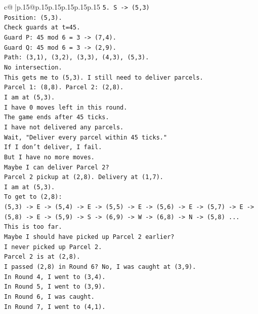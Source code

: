 \documentclass{article}
\begin{document}
{\begin{supertabular}{c@{$\;$}|p{.15\linewidth}@{}p{.15\linewidth}p{.15\linewidth}p{.15\linewidth}p{.15\linewidth}p{.15\linewidth}}
{{{\texttt{5. S {-}> (5,3)} \\
\texttt{Position: (5,3).} \\
\texttt{Check guards at t=45.} \\
\texttt{Guard P: 45 mod 6 = 3 {-}> (7,4).} \\
\texttt{Guard Q: 45 mod 6 = 3 {-}> (2,9).} \\
\texttt{Path: (3,1), (3,2), (3,3), (4,3), (5,3).} \\
\texttt{No intersection.} \\
\texttt{This gets me to (5,3). I still need to deliver parcels.} \\
\texttt{Parcel 1: (8,8). Parcel 2: (2,8).} \\
\texttt{I am at (5,3).} \\
\texttt{I have 0 moves left in this round.} \\
\texttt{The game ends after 45 ticks.} \\
\texttt{I have not delivered any parcels.} \\
\texttt{Wait, "Deliver every parcel within 45 ticks."} \\
\texttt{If I don't deliver, I fail.} \\
\texttt{But I have no more moves.} \\
\texttt{Maybe I can deliver Parcel 2?} \\
\texttt{Parcel 2 pickup at (2,8). Delivery at (1,7).} \\
\texttt{I am at (5,3).} \\
\texttt{To get to (2,8):} \\
\texttt{(5,3) {-}> E {-}> (5,4) {-}> E {-}> (5,5) {-}> E {-}> (5,6) {-}> E {-}> (5,7) {-}> E {-}> (5,8) {-}> E {-}> (5,9) {-}> S {-}> (6,9) {-}> W {-}> (6,8) {-}> N {-}> (5,8) ...} \\
\texttt{This is too far.} \\
\texttt{Maybe I should have picked up Parcel 2 earlier?} \\
\texttt{I never picked up Parcel 2.} \\
\texttt{Parcel 2 is at (2,8).} \\
\texttt{I passed (2,8) in Round 6? No, I was caught at (3,9).} \\
\texttt{In Round 4, I went to (3,4).} \\
\texttt{In Round 5, I went to (3,9).} \\
\texttt{In Round 6, I was caught.} \\
\texttt{In Round 7, I went to (4,1).} \\
}}}
\end{supertabular}}
\end{document}
